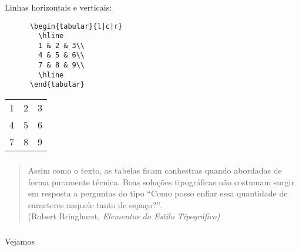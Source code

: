 \begin{frame}[fragile]
  \frametitle{}
  \Large
  Linhas horizontais e verticais:
  \vspace{1em}

  \begin{minipage}{.65\textwidth}
    \begin{verbatim}
      \begin{tabular}{l|c|r}
        \hline
        1 & 2 & 3\\
        4 & 5 & 6\\
        7 & 8 & 9\\
        \hline
      \end{tabular}
    \end{verbatim}
  \end{minipage}
  \hspace{.05\textwidth}
  \begin{minipage}{.25\textwidth}
    \begin{tabular}{l|c|r}
      \hline
      1 & 2 & 3\\
      4 & 5 & 6\\
      7 & 8 & 9\\
      \hline
    \end{tabular}
  \end{minipage}
\end{frame}

\begin{frame}
  \frametitle{}
  \large
  \begin{quote}
    Assim como o texto, as tabelas ficam canhestras quando abordadas de forma
    puramente técnica. Boas soluções tipográficas não costumam surgir em resposta
    a perguntas do tipo “Como posso enfiar essa quantidade de caracteres naquele
    tanto de espaço?”.\\\hfill (Robert Bringhurst, \emph{Elementos do Estilo
    Tipográfico)}
  \end{quote}
\end{frame}

\begin{frame}
  \frametitle{}
  \Huge
  Vejamos 
\end{frame}

